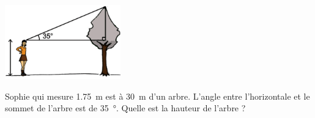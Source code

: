 
\begin{exercice}\label{exo2smath-0273}

    \begin{multicols}{2}

    \begin{center}
\includegraphics[width=5cm]{arbrecosinus2.pdf}
    \end{center}

    \columnbreak

    Sophie qui mesure \SI{1.75}{\meter} est à \SI{30}{\meter} d'un arbre. L'angle entre l'horizontale et le sommet de l'arbre est de \SI{35}{\degree}. Quelle est la hauteur de l'arbre ?

    \end{multicols}
\end{exercice}
